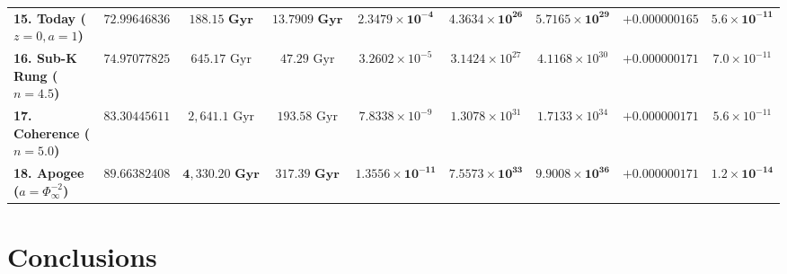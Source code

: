 \documentclass[11pt,a4paper]{article}
\theoremstyle{plain}
\theoremstyle{definition}
\theoremstyle{remark}
\numberwithin{equation}{section}
\begin{document}
\begin{table}[H]
{\begin{tabular}{@{} l c c c c c c c c @{}}
\textbf{15. Today ($z=0, a=1$)} & $\mathbf{72.99646836}$ & $\mathbf{188.15\text{ Gyr}}$ & $\mathbf{13.7909\text{ Gyr}}$ & $\mathbf{2.3479\times 10^{-4}}$ & $\mathbf{4.3634\times 10^{26}}$ & $\mathbf{5.7165\times 10^{29}}$ & $\mathbf{+0.000000165}$ & $\mathbf{5.6\times 10^{-11}}$ \\
\textbf{16. Sub-K Rung ($n=4.5$)} & $74.97077825$ & $645.17\text{ Gyr}$ & $47.29\text{ Gyr}$ & $3.2602\times 10^{-5}$ & $3.1424\times 10^{27}$ & $4.1168\times 10^{30}$ & $+0.000000171$ & $7.0\times 10^{-11}$ \\
\textbf{17. Coherence ($n=5.0$)} & $83.30445611$ & $2{,}641.1\text{ Gyr}$ & $193.58\text{ Gyr}$ & $7.8338\times 10^{-9}$ & $1.3078\times 10^{31}$ & $1.7133\times 10^{34}$ & $+0.000000171$ & $5.6\times 10^{-11}$ \\
\textbf{18. Apogee ($a=\Phi_{\infty}^{-2}$)} & $\mathbf{89.66382408}$ & $\mathbf{4{,}330.20\text{ Gyr}}$ & $\mathbf{317.39\text{ Gyr}}$ & $\mathbf{1.3556\times 10^{-11}}$ & $\mathbf{7.5573\times 10^{33}}$ & $\mathbf{9.9008\times 10^{36}}$ & $\mathbf{+0.000000171}$ & $\mathbf{1.2\times 10^{-14}}$ \\
\bottomrule
\end{tabular}%
}
\end{table}

\section{Conclusions}
\end{document}
